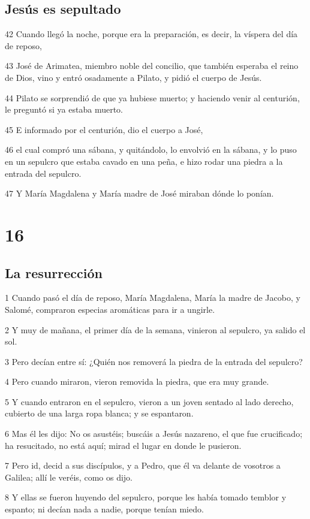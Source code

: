 \section*{Jesús es sepultado}

\par 42 Cuando llegó la noche, porque era la preparación, es decir, la víspera del día de reposo,
\par 43 José de Arimatea, miembro noble del concilio, que también esperaba el reino de Dios, vino y entró osadamente a Pilato, y pidió el cuerpo de Jesús.
\par 44 Pilato se sorprendió de que ya hubiese muerto; y haciendo venir al centurión, le preguntó si ya estaba muerto.
\par 45 E informado por el centurión, dio el cuerpo a José,
\par 46 el cual compró una sábana, y quitándolo, lo envolvió en la sábana, y lo puso en un sepulcro que estaba cavado en una peña, e hizo rodar una piedra a la entrada del sepulcro.
\par 47 Y María Magdalena y María madre de José miraban dónde lo ponían.

\chapter{16}

\section*{La resurrección}

\par 1 Cuando pasó el día de reposo, María Magdalena, María la madre de Jacobo, y Salomé, compraron especias aromáticas para ir a ungirle.
\par 2 Y muy de mañana, el primer día de la semana, vinieron al sepulcro, ya salido el sol.
\par 3 Pero decían entre sí: ¿Quién nos removerá la piedra de la entrada del sepulcro?
\par 4 Pero cuando miraron, vieron removida la piedra, que era muy grande.
\par 5 Y cuando entraron en el sepulcro, vieron a un joven sentado al lado derecho, cubierto de una larga ropa blanca; y se espantaron.
\par 6 Mas él les dijo: No os asustéis; buscáis a Jesús nazareno, el que fue crucificado; ha resucitado, no está aquí; mirad el lugar en donde le pusieron.
\par 7 Pero id, decid a sus discípulos, y a Pedro, que él va delante de vosotros a Galilea; allí le veréis, como os dijo.
\par 8 Y ellas se fueron huyendo del sepulcro, porque les había tomado temblor y espanto; ni decían nada a nadie, porque tenían miedo.

